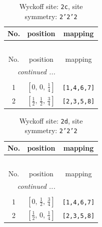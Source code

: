 \documentclass[fleqn,8pt]{jsarticle}
\begin{document}
\renewcommand{\arraystretch}{1.2}
\begin{longtable}{ccc}
\caption{Wyckoff site: {\tt 2c}, site symmetry: {\tt 2'2'2}}
 \\
 \hline \hline
No. & position & mapping \\ \hline \endfirsthead

\multicolumn{2}{l}{\tablename\ \thetable{}} \\
 \hline \hline
No. & position & mapping \\ \hline \endhead

 \hline \hline
\multicolumn{2}{r}{\footnotesize\it continued ...} \\ \endfoot

 \hline \hline
\multicolumn{2}{r}{} \\ \endlastfoot

1 & $\left[ 0,\, 0,\, \frac{1}{4} \right]$ & {\tt [1,4,6,7]} \\ \hline
2 & $\left[ \frac{1}{2},\, \frac{1}{2},\, \frac{3}{4} \right]$ & {\tt [2,3,5,8]} \\
\end{longtable}
\renewcommand{\arraystretch}{1.2}
\begin{longtable}{ccc}
\caption{Wyckoff site: {\tt 2d}, site symmetry: {\tt 2'2'2}}
 \\
 \hline \hline
No. & position & mapping \\ \hline \endfirsthead

\multicolumn{2}{l}{\tablename\ \thetable{}} \\
 \hline \hline
No. & position & mapping \\ \hline \endhead

 \hline \hline
\multicolumn{2}{r}{\footnotesize\it continued ...} \\ \endfoot

 \hline \hline
\multicolumn{2}{r}{} \\ \endlastfoot

1 & $\left[ 0,\, \frac{1}{2},\, \frac{3}{4} \right]$ & {\tt [1,4,6,7]} \\ \hline
2 & $\left[ \frac{1}{2},\, 0,\, \frac{1}{4} \right]$ & {\tt [2,3,5,8]} \\
\end{longtable}
\renewcommand{\arraystretch}{1.2}
\end{document}
